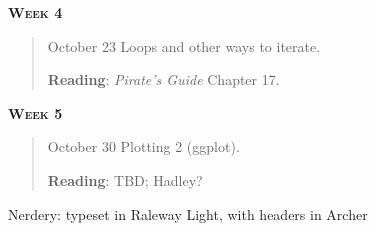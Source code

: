 \documentclass[11pt,letterpaper]{article}
\begin{document}
\textbf{\textsc{Week 4}}
\begin{quote}	
October 23  \textbullet \space Loops and other ways to iterate. 

\textbf{Reading}: \textit{Pirate's Guide} Chapter 17.

\end{quote}

\textbf{\textsc{Week 5}}
\begin{quote}	
October 30  \textbullet \space Plotting 2 (ggplot). 

\textbf{Reading}: TBD; Hadley?

\end{quote}


\vfill
{\tiny Nerdery: typeset in Raleway Light, with headers in Archer}
\end{document}
